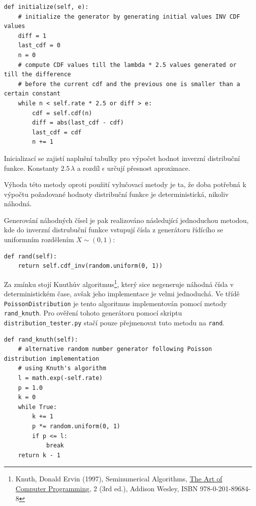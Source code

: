 \documentclass[12pt, a4paper]{article}
\begin{document}
   \begin{lstlisting}
def initialize(self, e):
    # initialize the generator by generating initial values INV CDF values
    diff = 1
    last_cdf = 0
    n = 0
    # compute CDF values till the lambda * 2.5 values generated or till the difference
    # before the current cdf and the previous one is smaller than a certain constant
    while n < self.rate * 2.5 or diff > e:
        cdf = self.cdf(n)
        diff = abs(last_cdf - cdf)
        last_cdf = cdf
        n += 1
   \end{lstlisting}

    Inicializací se zajistí naplnění tabulky pro výpočet hodnot inverzní distribuční funkce. Konstanty $2.5\, \lambda$ a
    rozdíl $\epsilon$ určují přesnost aproximace.

    Výhoda této metody oproti použití vylučovací metody je ta, že doba potřebná k výpočtu požadované hodnoty distribuční funkce je
    deterministická, nikoliv náhodná.

    Generování náhodných čísel je pak realizováno následující jednoduchou metodou, kde do inverzní distrubuční funkce vstupují
    čísla z generátoru řídícího se uniformním rozdělením $X \sim (0, 1)$:

    \begin{lstlisting}
def rand(self):
    return self.cdf_inv(random.uniform(0, 1))
    \end{lstlisting}

    Za zmínku stojí Knuthův algoritmus\footnote{Knuth, Donald Ervin (1997), Seminumerical Algorithms, \hyperlink{https://en.wikipedia.org/wiki/The\_Art\_of\_Computer\_Programming}{The Art of Computer Programming}, 2 (3rd ed.), Addison Wesley, ISBN 978-0-201-89684-8}, který sice negeneruje náhodná čísla v deterministickém čase, avšak jeho implementace
    je velmi jednoduchá. Ve třídě \texttt{PoissonDistribution} je tento algoritmus implementován pomocí metody \texttt{rand\_knuth}.
    Pro ověření tohoto generátoru pomocí skriptu \texttt{distribution_tester.py} stačí pouze přejmenovat tuto metodu na \texttt{rand}.

    \begin{lstlisting}
def rand_knuth(self):
    # alternative random number generator following Poisson distribution implementation
    # using Knuth's algorithm
    l = math.exp(-self.rate)
    p = 1.0
    k = 0
    while True:
        k += 1
        p *= random.uniform(0, 1)
        if p <= l:
            break
    return k - 1
    \end{lstlisting}
\end{document}
